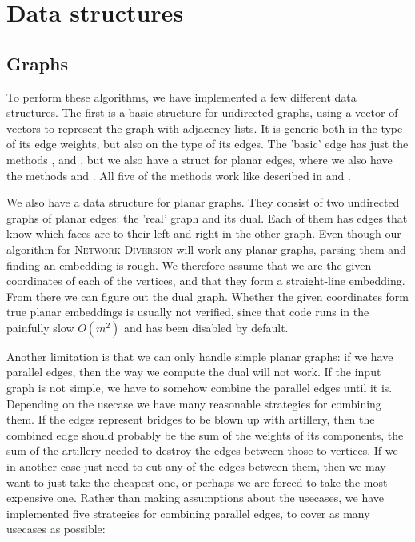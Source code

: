 \section{Data structures}
\subsection{Graphs}
To perform these algorithms, we have implemented a few different data structures. The first is a basic structure for undirected graphs, using a vector of vectors to represent the graph with adjacency lists. It is generic both in the type of its edge weights, but also on the type of its edges.  The 'basic' edge has just the methods ,  and , but we also have a struct for planar edges, where we also have the methods  and . All five of the methods work like described in  and . 

We also have a data structure for planar graphs. They consist of two undirected graphs of planar edges: the 'real' graph and its dual. Each of them has edges that know which faces are to their left and right in the other graph. Even though our algorithm for \textsc{Network Diversion} will work any planar graphs, parsing them and finding an embedding is rough. We therefore assume that we are the given coordinates of each of the vertices, and that they form a straight-line embedding. From there we can figure out the dual graph. Whether the given coordinates form true planar embeddings is usually not verified, since that code runs in the painfully slow $O(m^2)$ and has been disabled by default.

Another limitation is that we can only handle simple planar graphs: if we have parallel edges, then the way we compute the dual will not work. If the input graph is not simple, we have to somehow combine the parallel edges until it is. Depending on the usecase we have many reasonable strategies for combining them. If the edges represent bridges to be blown up with artillery, then the combined edge should probably be the sum of the weights of its components, the sum of the artillery needed to destroy the edges between those to vertices. If we in another case just need to cut any of the edges between them, then we may want to just take the cheapest one, or perhaps we are forced to take the most expensive one. Rather than making assumptions about the usecases, we have implemented five strategies for combining parallel edges, to cover as many usecases as possible:

